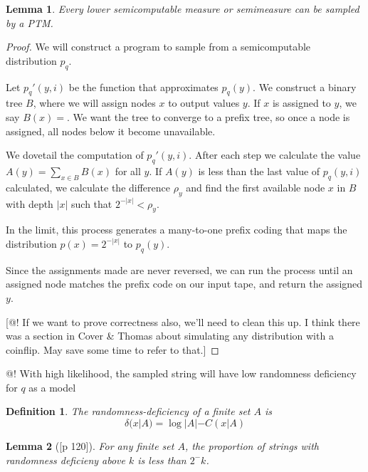 \documentclass[10pt,a4paper,oneside]{article}
\newtheorem{lma}{Lemma}
\newtheorem{dfn}{Definition}
\begin{document}
\begin{lma}
Every lower semicomputable measure or semimeasure can be sampled by a PTM.
\end{lma}
\begin{proof}
We will construct a program to sample from a semicomputable distribution $p_q$. 

Let $p_q'(y, i)$ be the function that approximates $p_q(y)$. We construct a binary tree $B$, where we will assign nodes $x$ to output values $y$. If $x$ is assigned to $y$, we say $B(x) = $. We want the tree to converge to a prefix tree, so once a node is assigned, all nodes below it become unavailable. 

We dovetail the computation of $p_q'(y, i)$. After each step we calculate the value $A(y) = \sum_{x \in B} B(x)$ for all $y$. If $A(y)$ is less than the last value of $p_q(y, i)$ calculated, we calculate the difference $\rho_y$ and find the first available  node $x$ in $B$ with depth $|x|$ such that $2^{-|x|} < \rho_y$.

In the limit, this process generates a many-to-one prefix coding that maps the distribution $p(x) = 2^{-|x|}$ to $p_q(y)$.

Since the assignments made are never reversed, we can run the process until an assigned node matches the prefix code on our input tape, and return the assigned $y$.
  
[@! If we want to prove correctness also, we'll need to clean this up. I think there was a section in Cover \& Thomas about simulating any distribution with a coinflip. May save some time to refer to that.]
\end{proof}

@! With high likelihood, the sampled string will have low randomness deficiency for $q$ as a model

\begin{dfn}
The randomness-deficiency of a finite set $A$ is 
\[
\delta(x|A) = \log |A| - C(x|A)
\]
\end{dfn}

\begin{lma}[{\cite{li1993introduction}[p 120]}]
For any finite set $A$, the proportion of strings with randomness deficieny above $k$ is less than $2^-k$. 
\end{lma}
\end{document}
